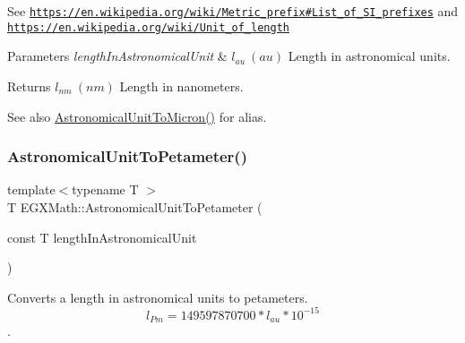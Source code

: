 See \href{https://en.wikipedia.org/wiki/Metric_prefix#List_of_SI_prefixes}{\tt https\+://en.\+wikipedia.\+org/wiki/\+Metric\+\_\+prefix\#\+List\+\_\+of\+\_\+\+S\+I\+\_\+prefixes} and \href{https://en.wikipedia.org/wiki/Unit_of_length}{\tt https\+://en.\+wikipedia.\+org/wiki/\+Unit\+\_\+of\+\_\+length} 
\begin{DoxyParams}{Parameters}
{\em length\+In\+Astronomical\+Unit} & $ l_{au}\ (au)$ Length in astronomical units. \\
\hline
\end{DoxyParams}
\begin{DoxyReturn}{Returns}
$ l_{nm}\ (nm)$ Length in nanometers. 
\end{DoxyReturn}
\begin{DoxySeeAlso}{See also}
\mbox{\hyperlink{group___e_g_x_math-_conversions-_length_conversions-_astronomical-_astronomical_unit-_non-_s_i_ga9fd03b0356095288ca7476121e45042d}{Astronomical\+Unit\+To\+Micron()}} for alias. 
\end{DoxySeeAlso}
\mbox{\label{group___e_g_x_math-_conversions-_length_conversions-_astronomical-_astronomical_unit-_s_i_gad8745fa5ccc5e8170717b4fd70c66623}} 
\subsubsection{\texorpdfstring{Astronomical\+Unit\+To\+Petameter()}{AstronomicalUnitToPetameter()}}
{\footnotesize\ttfamily template$<$typename T $>$ \\
T E\+G\+X\+Math\+::\+Astronomical\+Unit\+To\+Petameter (\begin{DoxyParamCaption}\item[{const T}]{length\+In\+Astronomical\+Unit }\end{DoxyParamCaption})}



Converts a length in astronomical units to petameters. \[ l_{Pm}=149597870700 * l_{au} * 10^{-15} \]. 

